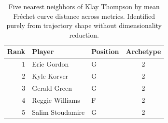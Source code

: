 \begin{table}[htbp]
  \centering\small
  \begin{tabular}{rllc}
    \toprule
    Rank & Player & Position & Archetype \\
    \midrule
    1 & Eric Gordon & G & 2 \\
    2 & Kyle Korver & G & 2 \\
    3 & Gerald Green & G & 2 \\
    4 & Reggie Williams & F & 2 \\
    5 & Salim Stoudamire & G & 2 \\
    \bottomrule
  \end{tabular}
  \caption{Five nearest neighbors of Klay Thompson by mean Fr\'{e}chet curve distance across metrics. Identified purely from trajectory shape without dimensionality reduction.}
  \label{tab:Klay_Thompson_frechet_curve_neighbors}
\end{table}

